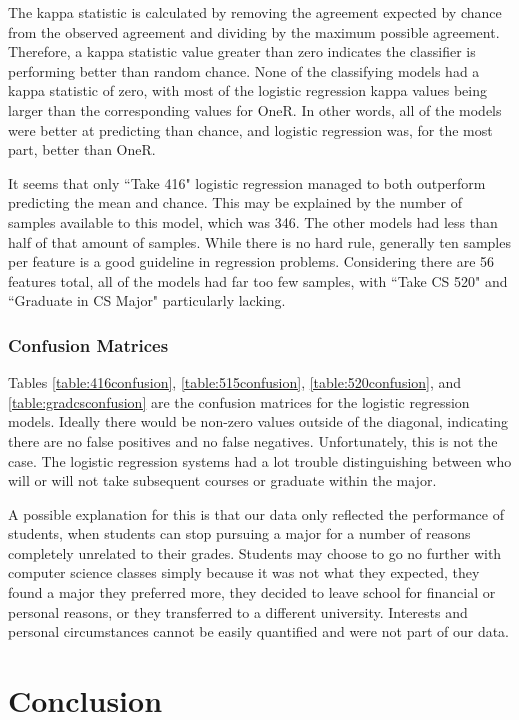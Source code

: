 \documentclass[letterpaper,11pt]{article}
\begin{document}
The kappa statistic is calculated by removing the agreement expected by chance from the observed agreement and dividing by the maximum possible agreement.  Therefore, a kappa statistic value greater than zero indicates the classifier is performing better than random chance.  None of the classifying models had a kappa statistic of zero, with most of the logistic regression kappa values being larger than the corresponding values for OneR.  In other words, all of the models were better at predicting than chance, and logistic regression was, for the most part, better than OneR.

It seems that only ``Take 416" logistic regression managed to both outperform predicting the mean and chance.  This may be explained by the number of samples available to this model, which was 346.  The other models had less than half of that amount of samples.  While there is no hard rule, generally ten samples per feature is a good guideline in regression problems.  Considering there are 56 features total, all of the models had far too few samples, with ``Take CS 520" and ``Graduate in CS Major" particularly lacking.

\subsubsection{Confusion Matrices}

Tables \ref{table:416confusion}, \ref{table:515confusion}, \ref{table:520confusion}, and \ref{table:gradcsconfusion} are the confusion matrices for the logistic regression models.   Ideally there would be non-zero values outside of the diagonal, indicating there are no false positives and no false negatives.  Unfortunately, this is not the case.  The logistic regression systems had a lot trouble distinguishing between who will or will not take subsequent courses or graduate within the major.

A possible explanation for this is that our data only reflected the performance of students, when students can stop pursuing a major for a number of reasons completely unrelated to their grades.  Students may choose to go no further with computer science classes simply because it was not what they expected, they found a major they preferred more, they decided to leave school for financial or personal reasons, or they transferred to a different university.  Interests and personal circumstances cannot be easily quantified and were not part of our data.

\section{Conclusion}
\end{document}

